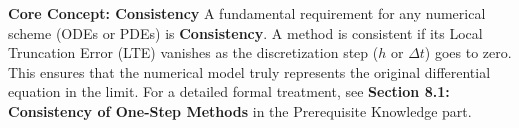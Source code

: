 
\textbf{Core Concept: Consistency}
A fundamental requirement for any numerical scheme (ODEs or PDEs) is \textbf{Consistency}. A method is consistent if its Local Truncation Error (LTE) vanishes as the discretization step ($h$ or $\Delta t$) goes to zero. This ensures that the numerical model truly represents the original differential equation in the limit. 
For a detailed formal treatment, see \textbf{Section 8.1: Consistency of One-Step Methods} in the Prerequisite Knowledge part.
